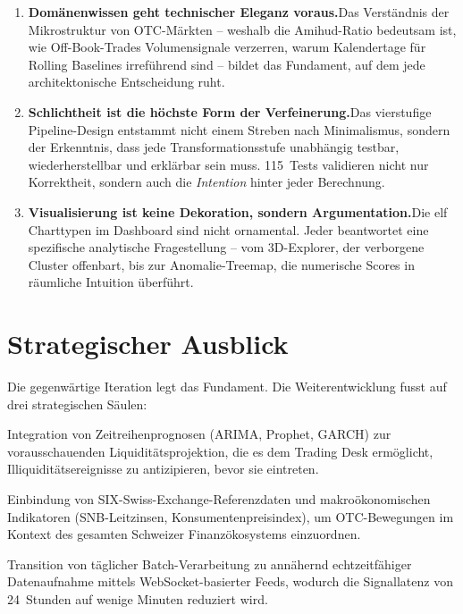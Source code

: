 \documentclass[11pt, a4paper, oneside, openany]{report}
\begin{document}
\begin{enumerate}[label=\textcolor{MetricBlue}{\textbf{(\roman*)}}]
  \item \textbf{Domänenwissen geht technischer Eleganz voraus.}\;Das Verständnis der Mikrostruktur von OTC-Märkten -- weshalb die Amihud-Ratio bedeutsam ist, wie Off-Book-Trades Volumensignale verzerren, warum Kalendertage für Rolling Baselines irreführend sind -- bildet das Fundament, auf dem jede architektonische Entscheidung ruht.
  \item \textbf{Schlichtheit ist die höchste Form der Verfeinerung.}\;Das vierstufige Pipeline-Design entstammt nicht einem Streben nach Minimalismus, sondern der Erkenntnis, dass jede Transformationsstufe unabhängig testbar, wiederherstellbar und erklärbar sein muss. 115~Tests validieren nicht nur Korrektheit, sondern auch die \emph{Intention} hinter jeder Berechnung.
  \item \textbf{Visualisierung ist keine Dekoration, sondern Argumentation.}\;Die elf Charttypen im Dashboard sind nicht ornamental. Jeder beantwortet eine spezifische analytische Fragestellung -- vom 3D-Explorer, der verborgene Cluster offenbart, bis zur Anomalie-Treemap, die numerische Scores in räumliche Intuition überführt.
\end{enumerate}

\section{Strategischer Ausblick}

Die gegenwärtige Iteration legt das Fundament. Die Weiterentwicklung fusst auf drei strategischen Säulen:

\begin{description}[style=nextline, leftmargin=1.5em]
  \item[\textcolor{SwissRed}{Säule~I\;---\;Prädiktive Analytik}]
  Integration von Zeitreihenprognosen (ARIMA, Prophet, GARCH) zur vorausschauenden Liquiditätsprojektion, die es dem Trading Desk ermöglicht, Illiquiditätsereignisse zu antizipieren, bevor sie eintreten.
  \item[\textcolor{SwissRed}{Säule~II\;---\;Marktübergreifende Anreicherung}]
  Einbindung von SIX-Swiss-Exchange-Referenzdaten und makroökonomischen Indikatoren (SNB-Leitzinsen, Konsumentenpreisindex), um OTC-Bewegungen im Kontext des gesamten Schweizer Finanzökosystems einzuordnen.
  \item[\textcolor{SwissRed}{Säule~III\;---\;Echtzeit-Streaming}]
  Transition von täglicher Batch-Verarbeitung zu annähernd echtzeitfähiger Datenaufnahme mittels WebSocket-basierter Feeds, wodurch die Signallatenz von 24~Stunden auf wenige Minuten reduziert wird.
\end{description}
\end{document}
